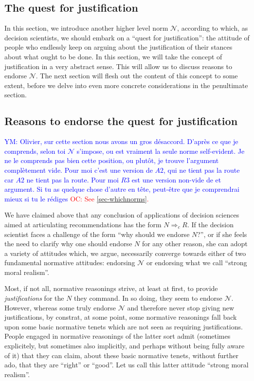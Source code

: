 \documentclass[preprint, french, english, 11pt, authoryear]{elsarticle}%
\newcommand{\commentYM}[1]{\textcolor{blue}{YM: #1}}
\newcommand{\commentOC}[1]{\textcolor{red}{OC: #1}}
\newcommand{\adv}{\mathscr{N}}
\begin{document}
\subsection{The quest for justification}
\label{sec-quest}
In this section, we introduce another higher level norm $\adv$, according to which, as decision scientists, we should embark on a ``quest for justification'': the attitude of people who endlessly keep on arguing about the justification of their stances about what ought to be done. In this section, we will take the concept of justification in a very abstract sense. This will allow us to discuss reasons to endorse $\adv$. The next section will flesh out the content of this concept to some extent, before we delve into even more concrete considerations in the penultimate section.

\subsection{Reasons to endorse the quest for justification}

\commentYM{Olivier, sur cette section nous avons un gros désaccord. D'après ce que je comprends, selon toi $\adv$ s'impose, ou est vraiment la seule norme self-evident. Je ne le comprends pas bien cette position, ou plutôt, je trouve l'argument complètement vide. Pour moi c'est une version de $A2$, qui ne tient pas la route car $A2$ ne tient pas la route. Pour moi $R3$ est une version non-vide de et argument. Si tu as quelque chose d'autre en tête, peut-être que je comprendrai mieux si tu le rédiges}
\commentOC{See \cref{sec-whichnorms}.}

We have claimed above that any conclusion of applications of decision sciences aimed at articulating recommendations has the form $N ⇒_c R$. If the decision scientist faces a challenge of the form ``why should we endorse $N$?'', or if she feels the need to clarify why one should endorse $N$ for any other reason, she can adopt a variety of attitudes which, we argue, necessarily converge towards either of two fundamental normative attitudes: endorsing $\adv$ or endorsing what we call ``strong moral realism''.

Most, if not all, normative reasonings strive, at least at first, to provide \emph{justifications} for the $N$ they command. In so doing, they seem to endorse $\adv$. However, whereas some truly endorse $\adv$ and therefore never stop giving new justifications, by constrat, at some point, some normative reasonings fall back upon some basic normative tenets which are not seen as requiring justifications. People engaged in normative reasonings of the latter sort admit (sometimes explicitely, but sometimes also implicitly, and perhaps without being fully aware of it) that they can claim, about these basic normative tenets, without further ado, that they are ``right'' or ``good''. Let us call this latter attitude ``strong moral realism''.
\end{document}
